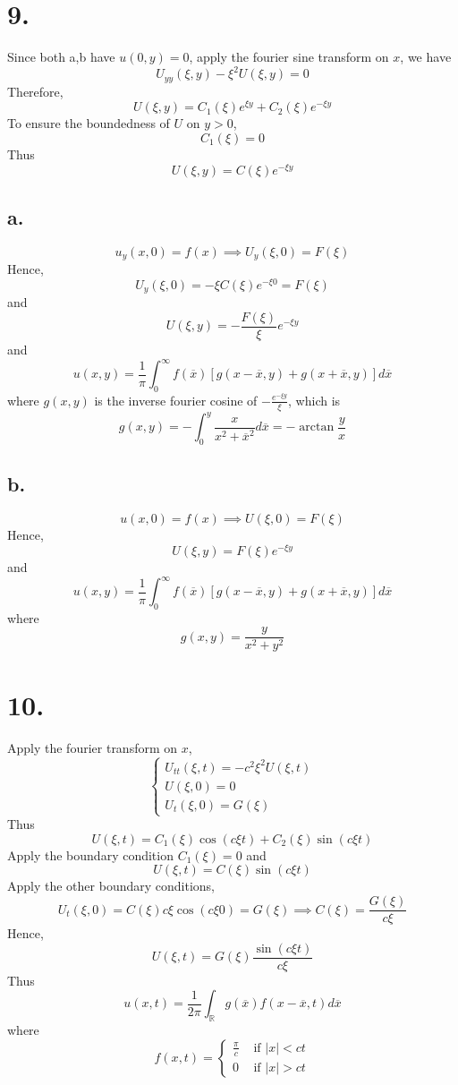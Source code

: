 \documentclass[11pt]{article}
\theoremstyle{mystyle}
\theoremstyle{definition}
\begin{document}
\section*{9.}
Since both a,b have $u(0,y) = 0$, apply the fourier sine transform on $x$, we have 
\[
  U_{yy}(\xi, y) - \xi^2 U(\xi, y) = 0 
\]
Therefore, 
\[
  U(\xi, y) = C_1(\xi) e^{\xi y} + C_2(\xi) e^{-\xi y}
\]
To ensure the boundedness of $U$ on $y>0$, 
\[
  C_1(\xi) = 0
\]
Thus 
\[
  U(\xi, y) = C(\xi) e^{-\xi y}
\]
\subsection*{a.}
\[
  u_y(x,0) = f(x) \implies U_y(\xi, 0) = F(\xi)
\]
Hence, 
\[
  U_y(\xi, 0) = -\xi C(\xi) e^{-\xi 0} = F(\xi)
\]
and 
\[
  U(\xi, y) = - \displaystyle\frac{F(\xi)}{\xi} e^{-\xi y}
\]
and 
\[
  u(x, y) = \displaystyle\frac{1}{\pi} \int_0^\infty f(\overline x)[g(x-\overline x,y) + g(x+ \overline x,y)] d\overline{x}
\]
where $g(x,y)$ is the inverse fourier cosine of $-\displaystyle\frac{e^{-\xi y}}{\xi}$, which is 
\[
  g(x,y) = - \int_0^y \displaystyle\frac{x}{x^2 + \overline x^2} d\overline x = - \arctan \displaystyle\frac{y}{x}
\]
\subsection*{b.}
\[
  u(x,0) = f(x) \implies U(\xi, 0) = F(\xi)
\]
Hence, 
\[
  U(\xi, y) = F(\xi) e^{-\xi y}
\]
and 
\[
  u(x, y) = \displaystyle\frac{1}{\pi} \int_0^\infty f(\overline x)[g(x-\overline x,y) + g(x+ \overline x,y)] d\overline{x}
\]
where 
\[
  g(x,y) = \displaystyle\frac{y}{x^2 + y^2}
\]
\newpage
\section*{10.}
Apply the fourier transform on $x$,    
\[
  \begin{cases}
    U_{tt}(\xi, t) = - c^2 \xi^2 U(\xi, t) \\
    U(\xi, 0) = 0 \\
    U_t(\xi, 0) = G(\xi) 
  \end{cases}
\]
Thus 
\[
  U(\xi, t) = C_1(\xi) \cos(c\xi t) + C_2(\xi) \sin(c \xi t)
\]
Apply the boundary condition $C_1(\xi) = 0$ and 
\[
  U(\xi, t) = C(\xi) \sin(c\xi t)
\]
Apply the other boundary conditions, 
\[
  U_t(\xi, 0) = C(\xi) c\xi \cos(c\xi 0) = G(\xi) \implies C(\xi) = \displaystyle\frac{G(\xi)}{c \xi}
\]
Hence, 
\[
  U(\xi, t) = G(\xi) \displaystyle\frac{\sin(c\xi t)}{c\xi }
\]
Thus 
\[
  u(x,t) = \displaystyle\frac{1}{2\pi} \int_\mathbb{R} g(\overline x) f(x-\overline x, t) d\overline x
\]
where 
\[
  f(x, t) = 
  \begin{cases}
    \displaystyle\frac{\pi}{c} &\text{ if } |x| < ct \\
    0 &\text{ if } |x| > ct
  \end{cases}
\]
\end{document}

